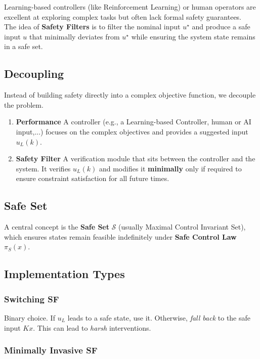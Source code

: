 Learning-based controllers (like Reinforcement Learning) or human
operators are excellent at exploring complex tasks but often lack
formal safety guarantees.
\\
The idea of \textbf{Safety Filters}
is to filter the nominal input $u^\star$
and produce a safe input $u$
that minimally deviates from $u^\star$
while ensuring the system state remains in a safe set.

\subsection{Decoupling}

Instead of building safety directly into a complex objective function,
we decouple the problem.

\begin{enumerate}
  \item \textbf{Performance}
    A controller (e.g., a Learning-based Controller, human or AI input,...)
    focuses on the complex objectives and provides a suggested input $u_L(k)$.
  \item \textbf{Safety Filter} A verification module that sits between the
    controller and the system. It verifies $u_L(k)$ and modifies it
    \textbf{minimally} only if required to ensure constraint satisfaction
    for all future times.
\end{enumerate}

\subsection{Safe Set}

A central concept is the \textbf{Safe Set} $\mathcal{S}$
(usually Maximal Control Invariant Set),
which ensures states remain feasible indefinitely under
\textbf{Safe Control Law} $\pi_S(x)$.

\subsection{Implementation Types}

\subsubsection{Switching SF}

Binary choice. If $u_L$ leads to a safe state, use it.
Otherwise, \textit{fall back} to the safe input $Kx$.
This can lead to \textit{harsh} interventions.

\subsubsection{Minimally Invasive SF}


